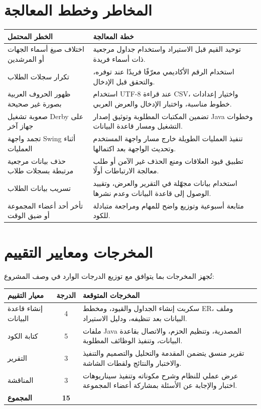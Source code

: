 \documentclass[12pt,a4paper]{article}
\begin{document}
\section{المخاطر وخطط المعالجة}
\begin{longtable}{|p{5cm}|p{9cm}|}
\hline
\textbf{الخطر المحتمل} & \textbf{خطة المعالجة}\\ \hline
اختلاف صيغ أسماء الجهات أو المرشدين & توحيد القيم قبل الاستيراد واستخدام جداول مرجعية ذات أسماء فريدة.\\ \hline
تكرار سجلات الطلاب & استخدام الرقم الأكاديمي معرّفًا فريدًا عند توفره، والتحقق قبل الإدخال.\\ \hline
ظهور الحروف العربية بصورة غير صحيحة & استخدام UTF-8 عند قراءة CSV، واختيار إعدادات خطوط مناسبة، واختبار الإدخال والعرض العربي.\\ \hline
صعوبة تشغيل Derby على جهاز آخر & تضمين المكتبات المطلوبة وتوثيق إصدار Java وخطوات التشغيل ومسار قاعدة البيانات.\\ \hline
تجمد واجهة Swing أثناء العمليات & تنفيذ العمليات الطويلة خارج مسار واجهة المستخدم وتحديث الواجهة بعد اكتمالها.\\ \hline
حذف بيانات مرجعية مرتبطة بسجلات طلاب & تطبيق قيود العلاقات ومنع الحذف غير الآمن أو طلب معالجة الارتباطات أولًا.\\ \hline
تسريب بيانات الطلاب & استخدام بيانات مجهّلة في التقرير والعرض، وتقييد الوصول إلى قاعدة البيانات وعدم نشرها.\\ \hline
تأخر أحد أعضاء المجموعة أو ضيق الوقت & متابعة أسبوعية وتوزيع واضح للمهام ومراجعة متبادلة للكود.\\ \hline
\end{longtable}

\section{المخرجات ومعايير التقييم}
تُجهز المخرجات بما يتوافق مع توزيع الدرجات الوارد في وصف المشروع:

\begin{tabularx}{\textwidth}{|p{4cm}|C|Y|}
\hline
\textbf{معيار التقييم} & \textbf{الدرجة} & \textbf{المخرجات المتوقعة}\\ \hline
إنشاء قاعدة البيانات & 4 & سكربت إنشاء الجداول والقيود، ومخطط ER، وملف البيانات بعد تنظيفه، ودليل الاستيراد.\\ \hline
كتابة الكود & 5 & ملفات Java المصدرية، وتنظيم الحزم، والاتصال بقاعدة البيانات، وتنفيذ الوظائف المطلوبة.\\ \hline
التقرير & 3 & تقرير منسق يتضمن المقدمة والتحليل والتصميم والتنفيذ والاختبار والنتائج ولقطات الشاشة.\\ \hline
المناقشة & 3 & عرض عملي للنظام وشرح مكوناته وتنفيذ سيناريوهات اختبار والإجابة عن الأسئلة بمشاركة أعضاء المجموعة.\\ \hline
\textbf{المجموع} & \textbf{15} & \\ \hline
\end{tabularx}
\end{document}

